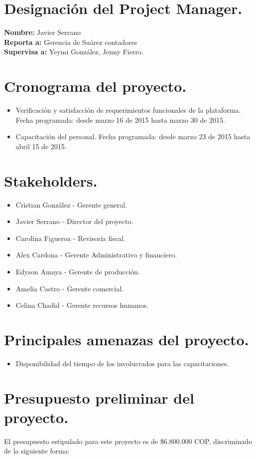 \chapter{Designaci\'on del Project Manager.}
%
\noindent \textbf{Nombre:} Javier Serrano\\
\textbf{Reporta a:} Gerencia de Su\'arez contadores\\
\textbf{Supervisa a:} Yeymi Gonz\'alez, Jenny Fierro.
%

\chapter{Cronograma del proyecto.}
%
\begin{itemize}
	\item Verificaci\'on y satisfacci\'on de requerimientos funcionales de la plataforma. Fecha
	programada: desde marzo 16 de 2015 hasta marzo 30 de 2015.
	
	\item Capacitaci\'on del personal. Fecha programada: desde marzo 23 de 2015 hasta abril 15
	de 2015.
\end{itemize}
\chapter{Stakeholders.}
%
\begin{itemize}
	\item Cristian Gonz\'alez - Gerente general.
	\item Javier Serrano - Director del proyecto.
	\item Carolina Figueroa - Revisor\'ia fiscal.
	\item Alex Cardona - Gerente Administrativo y financiero.
	\item Edyson Amaya - Gerente de producci\'on.
	\item Amelia Castro - Gerente comercial.
	\item Celina Chadid - Gerente recursos humanos.
\end{itemize}

\chapter{Principales amenazas del proyecto.}
%
\begin{itemize}
	\item Disponibilidad del tiempo de los involucrados para las capacitaciones.
\end{itemize}

\chapter{Presupuesto preliminar del proyecto.}
%
\noindent
El presupuesto estipulado para este proyecto es de \$6.800.000 COP, discriminado de la 
siguiente forma:

